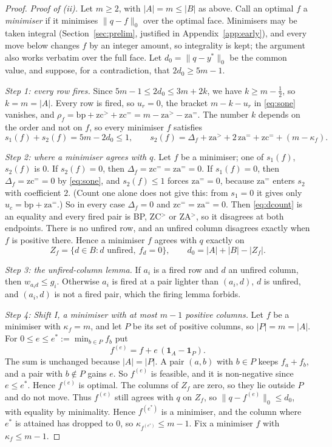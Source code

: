 \begin{proof}
\emph{Proof of (ii).} Let $m \ge 2$, with $|A| = m \le |B|$ as above. Call an optimal $f$ a
\emph{minimiser} if it minimises $\|q-f\|_0$ over the optimal face. Minimisers may be taken
integral (Section~\ref{sec:prelim}, justified in Appendix~\ref{app:early}), and every move below
changes $f$ by an integer amount, so integrality is kept; the argument also works verbatim over the
full face. Let $d_0 = \|q-y^*\|_0$ be the common value, and suppose, for a contradiction, that
$2d_0 \ge 5m-1$.

\emph{Step 1: every row fires.} Since $5m-1 \le 2d_0 \le 3m+2k$, we have
$k \ge m - \tfrac12$, so $k = m = |A|$. Every row is fired, so $u_r = 0$, the bracket $m-k-u_r$
in \eqref{eq:sone} vanishes, and $\rho_f = \mathrm{bp}+\mathrm{zc}^>+\mathrm{zc}^=
= m-\mathrm{za}^>-\mathrm{za}^=$. The number $k$ depends on the order and not on $f$, so every
minimiser $f$ satisfies
\[
  s_1(f)+s_2(f) = 5m-2d_0 \le 1, \qquad
  s_2(f) = \Delta_f + \mathrm{za}^> + 2\,\mathrm{za}^= + \mathrm{zc}^= + (m-\kappa_f).
\]

\emph{Step 2: where a minimiser agrees with $q$.} Let $f$ be a minimiser; one of $s_1(f)$,
$s_2(f)$ is $0$. If $s_2(f) = 0$, then $\Delta_f = \mathrm{zc}^= = \mathrm{za}^= = 0$. If
$s_1(f) = 0$, then $\Delta_f = \mathrm{zc}^= = 0$ by \eqref{eq:sone}, and $s_2(f) \le 1$ forces
$\mathrm{za}^= = 0$, because $\mathrm{za}^=$ enters $s_2$ with coefficient $2$. (Count one alone
does not give this: from $s_1 = 0$ it gives only $u_c = \mathrm{bp}+\mathrm{za}^=$.) So in every
case $\Delta_f = 0$ and $\mathrm{zc}^= = \mathrm{za}^= = 0$. Then \eqref{eq:dcount} is an
equality and every fired pair is BP, ZC$^>$ or ZA$^>$, so it disagrees at both endpoints. There
is no unfired row, and an unfired column disagrees exactly when $f$ is positive there. Hence a
minimiser $f$ agrees with $q$ exactly on
\[
  Z_f = \{ d \in B : d \text{ unfired},\ f_d = 0 \}, \qquad d_0 = |A|+|B|-|Z_f| .
\]

\emph{Step 3: the unfired-column lemma.} If $a_i$ is a fired row and $d$ an unfired column, then
$w_{a_i d} \le g_i$. Otherwise $a_i$ is fired at a pair lighter than $(a_i,d)$, $d$ is unfired,
and $(a_i,d)$ is not a fired pair, which the firing lemma forbids.

\emph{Step 4: Shift I, a minimiser with at most $m-1$ positive columns.} Let $f$ be a minimiser
with $\kappa_f = m$, and let $P$ be its set of positive columns, so $|P| = m = |A|$. For
$0 \le e \le e^* := \min_{b \in P} f_b$ put
\begin{equation}\label{eq:shiftone}
  f^{(e)} = f + e\,(\mathbf{1}_A - \mathbf{1}_P) .
\end{equation}
The sum is unchanged because $|A| = |P|$. A pair $(a,b)$ with $b \in P$ keeps $f_a+f_b$, and a
pair with $b \notin P$ gains $e$. So $f^{(e)}$ is feasible, and it is non-negative since
$e \le e^*$. Hence $f^{(e)}$ is optimal. The columns of $Z_f$ are zero, so they lie outside $P$
and do not move. Thus $f^{(e)}$ still agrees with $q$ on $Z_f$, so $\|q-f^{(e)}\|_0 \le d_0$,
with equality by minimality. Hence $f^{(e^*)}$ is a minimiser, and the column where $e^*$ is
attained has dropped to $0$, so $\kappa_{f^{(e^*)}} \le m-1$. Fix a minimiser $f$ with
$\kappa_f \le m-1$.


\end{proof}
